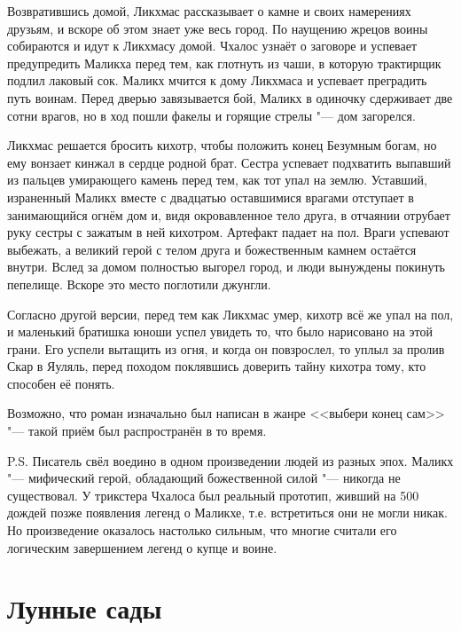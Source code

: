 \documentclass[a4paper,10pt]{book}
\begin{document}
Возвратившись домой, Ликхмас рассказывает 
о камне и своих намерениях друзьям, и вскоре об этом знает уже весь город. По 
наущению жрецов воины собираются и идут к Ликхмасу домой. Чхалос узнаёт о 
заговоре и успевает предупредить Маликха перед тем, как глотнуть из чаши, в 
которую трактирщик подлил лаковый сок. Маликх мчится 
к дому Ликхмаса и успевает преградить путь воинам. Перед дверью завязывается 
бой, Маликх в одиночку сдерживает две сотни врагов, но в ход пошли факелы и 
горящие стрелы "--- дом загорелся.

Ликхмас решается бросить кихотр, чтобы положить 
конец Безумным богам, но ему вонзает кинжал в сердце родной брат. 
Сестра успевает подхватить выпавший из пальцев умирающего камень перед тем, как 
тот упал на землю. Уставший, израненный Маликх вместе с двадцатью оставшимися 
врагами отступает в занимающийся огнём дом и, видя окровавленное тело друга, в 
отчаянии отрубает руку сестры с зажатым в ней кихотром. Артефакт падает на пол. 
Враги успевают выбежать, а великий герой с телом друга и божественным камнем 
остаётся внутри. Вслед за домом полностью выгорел город, и люди вынуждены 
покинуть пепелище. Вскоре это место поглотили джунгли.

Согласно другой версии, перед тем как Ликхмас умер, кихотр всё же упал на пол, 
и маленький братишка юноши успел увидеть то, что было нарисовано на этой грани. 
Его успели вытащить из огня, и когда он повзрослел, то уплыл за пролив Скар в 
Яуляль, перед походом поклявшись доверить тайну кихотра тому, кто способен её 
понять.

Возможно, что роман изначально был написан в жанре <<выбери конец сам>> "--- 
такой приём был распространён в то время.

P.S. Писатель свёл воедино в одном произведении людей из разных эпох. Маликх 
"--- мифический герой, обладающий божественной силой "--- никогда не 
существовал. 
У трикстера Чхалоса был реальный прототип, живший на 500 дождей позже появления 
легенд о Маликхе, т.е. встретиться они не могли никак. Но произведение 
оказалось настолько сильным, что многие считали его логическим завершением 
легенд о купце и воине.

\section{Лунные сады}
\end{document}
